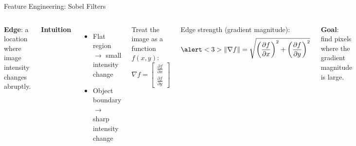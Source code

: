 \documentclass[
11pt,notheorems,hyperref={pdfauthor=whatever}
]{beamer}
\begin{document}

    

    

\begin{frame}{Feature Engineering: Sobel Filters}

\small

\begin{columns}[T,onlytextwidth] %


\alert<1>{\textbf{Edge}}: {a location where image intensity changes abruptly.}

\vspace{2em}

\alert<2>{\textbf{Intuition}}
\begin{itemize}
    \item {Flat region $\rightarrow$ small intensity change}
    \item {Object boundary $\rightarrow$ sharp intensity change}
\end{itemize}

\vspace{0.4em}

{
    Treat the \alert<2>{image as a function} $f(x,y)$:
    \[
    {\nabla f} =
    \begin{bmatrix}
    \frac{\partial f}{\partial x}\\[2pt]
    \frac{\partial f}{\partial y}
    \end{bmatrix}
    \]
}

{
    Edge strength (gradient magnitude):
    \[
    \alert<3>{\|\nabla f\|} =
    \sqrt{
    \left(\frac{\partial f}{\partial x}\right)^2 +
    \left(\frac{\partial f}{\partial y}\right)^2
    }
    \]
}


\alert<3>{\textbf{Goal}}: {find pixels where the gradient magnitude is large.}


\end{columns}
\end{frame}
\end{document}
